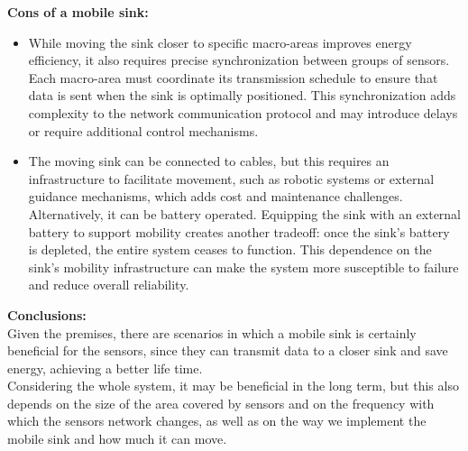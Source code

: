\textbf{Cons of a mobile sink:} 
\begin{itemize}
\item While moving the sink closer to specific macro-areas improves energy efficiency, it also requires precise synchronization between groups of sensors. Each macro-area must coordinate its transmission schedule to ensure that data is sent when the sink is optimally positioned. This synchronization adds complexity to the network communication protocol and may introduce delays or require additional control mechanisms.

\item The moving sink can be connected to cables, but this requires an infrastructure to facilitate movement, such as robotic systems or external guidance mechanisms, which adds cost and maintenance challenges.\\
Alternatively, it can be battery operated. Equipping the sink with an external battery to support mobility creates another tradeoff: once the sink's battery is depleted, the entire system ceases to function. This dependence on the sink's mobility infrastructure can make the system more susceptible to failure and reduce overall reliability.
\end{itemize}

\textbf{Conclusions:} \\
Given the premises, there are scenarios in which a mobile sink is certainly beneficial for the sensors, since they can transmit data to a closer sink and save energy, achieving a better life time.\\
Considering the whole system, it may be beneficial in the long term, but this also depends on the size of the area covered by sensors and on the frequency with which the sensors network changes, as well as on the way we implement the mobile sink and how much it can move.

